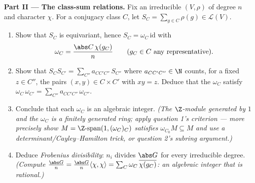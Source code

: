 \begin{problem}
\medskip
\noindent\textbf{Part II --- The class-sum relations.} Fix an
irreducible $(V, \rho)$ of degree $n$ and character $\chi$. For a
conjugacy class $C$, let $S_C = \sum_{g \in C}\rho(g) \in
\mathcal L(V)$.
\begin{enumerate}[resume]
  \item Show that $S_C$ is equivariant, hence $S_C =
        \omega_C\,\mathrm{id}$ with
        \[
        \omega_C = \frac{\abs C\,\chi(g_C)}{n}
        \qquad (g_C \in C \text{ any representative}).
        \]
  \item Show that $S_CS_{C'} = \sum_{C''}
        a_{CC'C''}\,S_{C''}$ where $a_{CC'C''} \in \N$ counts,
        for a fixed $z \in C''$, the pairs $(x, y) \in C \times
        C'$ with $xy = z$. Deduce that the $\omega_C$ satisfy
        $\omega_C\,\omega_{C'} = \sum_{C''}
        a_{CC'C''}\,\omega_{C''}$.
  \item Conclude that each $\omega_C$ is an algebraic integer.
        \emph{(The $\Z$-module generated by $1$ and the
        $\omega_C$ is a finitely generated ring; apply question
        1's criterion --- more precisely show $M = \Z\text{-span}
        (1, (\omega_C)_C)$ satisfies $\omega_{C_0} M \subseteq
        M$ and use a determinant/Cayley--Hamilton trick, or
        question 2's subring argument.)}
  \item Deduce \emph{Frobenius divisibility}: $n_i$ divides
        $\abs G$ for every irreducible degree.
        \emph{(Compute $\frac{\abs G}{n} = \frac{\abs G}{n}
        \langle\chi,\chi\rangle = \sum_C \omega_C\,
        \overline{\chi(g_C)}$: an algebraic integer that is
        rational.)}
\end{enumerate}


\end{problem}
